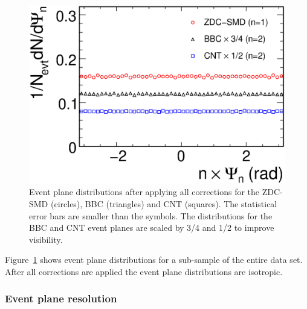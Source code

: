 \documentclass[aps,prc,superscriptaddress,showpacs,floatfix,twocolumn]{revtex4}
\begin{document}
\begin{figure}[htbp]
\includegraphics[width=1.0\linewidth]{eventplane_distribution_zdc-smd_bbc_cnt.eps}
\caption{\label{fig:eventplane_distribution_zdc-smd_bbc_cnt}
Event plane distributions after applying all corrections for the ZDC-SMD (circles), BBC (triangles) 
and CNT (squares). The statistical error bars are smaller than the symbols. The distributions for the 
BBC and CNT event planes are scaled by 3/4 and 1/2 to improve visibility. 
}
\end{figure}
Figure~\ref{fig:eventplane_distribution_zdc-smd_bbc_cnt} shows event plane distributions for a 
sub-sample of the entire data set. After all corrections are applied the event plane distributions 
are isotropic.

\subsubsection{Event plane resolution}
\label{subsubsec:eventplane_resolution}
\end{document}
